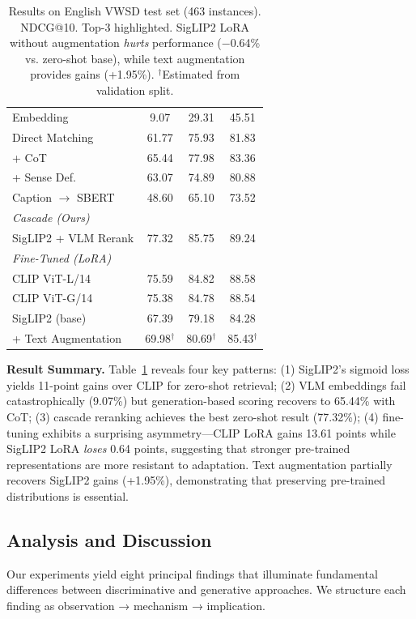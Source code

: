\documentclass[11pt]{article}
\begin{document}
\begin{table}[!ht]
{\begin{tabular}{l|ccc}
\midrule
Embedding & 9.07 & 29.31 & 45.51 \\
Direct Matching & 61.77 & 75.93 & 81.83 \\
\quad + CoT & 65.44 & 77.98 & 83.36 \\
\quad + Sense Def. & 63.07 & 74.89 & 80.88 \\
Caption $\rightarrow$ SBERT & 48.60 & 65.10 & 73.52 \\
\midrule
\multicolumn{4}{l}{\textit{Cascade (Ours)}} \\
\midrule
SigLIP2 + VLM Rerank & 77.32 & 85.75 & \cellcolor{gold}89.24 \\
\midrule
\multicolumn{4}{l}{\textit{Fine-Tuned (LoRA)}} \\
\midrule
CLIP ViT-L/14 & 75.59 & 84.82 & 88.58 \\
CLIP ViT-G/14 & 75.38 & 84.78 & 88.54 \\
SigLIP2 (base) & 67.39 & 79.18 & 84.28 \\
\quad + Text Augmentation & 69.98$^\dagger$ & 80.69$^\dagger$ & 85.43$^\dagger$ \\
\bottomrule
\end{tabular}%
}
\caption{Results on English VWSD test set (463 instances). NDCG@10. Top-3 highlighted. SigLIP2 LoRA without augmentation \textit{hurts} performance ($-$0.64\% vs. zero-shot base), while text augmentation provides gains (+1.95\%). $^\dagger$Estimated from validation split.}
\label{tab:results}
\end{table}

\textbf{Result Summary.} Table~\ref{tab:results} reveals four key patterns: (1) SigLIP2's sigmoid loss yields 11-point gains over CLIP for zero-shot retrieval; (2) VLM embeddings fail catastrophically (9.07\%) but generation-based scoring recovers to 65.44\% with CoT; (3) cascade reranking achieves the best zero-shot result (77.32\%); (4) fine-tuning exhibits a surprising asymmetry---CLIP LoRA gains 13.61 points while SigLIP2 LoRA \textit{loses} 0.64 points, suggesting that stronger pre-trained representations are more resistant to adaptation. Text augmentation partially recovers SigLIP2 gains (+1.95\%), demonstrating that preserving pre-trained distributions is essential.

\subsection{Analysis and Discussion}

Our experiments yield eight principal findings that illuminate fundamental differences between discriminative and generative approaches. We structure each finding as observation → mechanism → implication.
\end{document}
